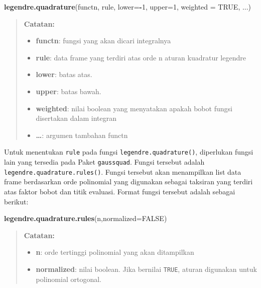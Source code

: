 \documentclass[
]{book}
\newenvironment{Shaded}{\begin{snugshade}}{\end{snugshade}}
\newcommand{\AttributeTok}[1]{\textcolor[rgb]{0.13,0.29,0.53}{#1}}
\newcommand{\ConstantTok}[1]{\textcolor[rgb]{0.56,0.35,0.01}{#1}}
\newcommand{\DecValTok}[1]{\textcolor[rgb]{0.00,0.00,0.81}{#1}}
\newcommand{\FunctionTok}[1]{\textcolor[rgb]{0.13,0.29,0.53}{\textbf{#1}}}
\newcommand{\NormalTok}[1]{#1}
\newcommand{\SpecialCharTok}[1]{\textcolor[rgb]{0.81,0.36,0.00}{\textbf{#1}}}
\providecommand{\tightlist}{%
  \setlength{\itemsep}{0pt}\setlength{\parskip}{0pt}}
\theoremstyle{definition}
\theoremstyle{definition}
\theoremstyle{definition}
\theoremstyle{definition}
\theoremstyle{remark}
\begin{document}
\begin{Shaded}
\begin{Highlighting}[]
\FunctionTok{legendre.quadrature}\NormalTok{(functn, rule, }\AttributeTok{lower=}\SpecialCharTok{{-}}\DecValTok{1}\NormalTok{, }\AttributeTok{upper=}\DecValTok{1}\NormalTok{, }
  \AttributeTok{weighted =} \ConstantTok{TRUE}\NormalTok{, ...)}
\end{Highlighting}
\end{Shaded}

\begin{quote}
\textbf{Catatan:}

\begin{itemize}
\tightlist
\item
  \textbf{functn}: fungsi yang akan dicari integralnya
\item
  \textbf{rule}: data frame yang terdiri atas orde n aturan kuadratur legendre
\item
  \textbf{lower}: batas atas.
\item
  \textbf{upper}: batas bawah.
\item
  \textbf{weighted}: nilai boolean yang menyatakan apakah bobot fungsi disertakan dalam integran
\item
  \textbf{\ldots{}}: argumen tambahan functn
\end{itemize}
\end{quote}

Untuk menentukan \texttt{rule} pada fungsi \texttt{legendre.quadrature()}, diperlukan fungsi lain yang tersedia pada Paket \texttt{gaussquad}. Fungsi tersebut adalah \texttt{legendre.quadrature.rules()}. Fungsi tersebut akan menampilkan list data frame berdasarkan orde polinomial yang digunakan sebagai taksiran yang terdiri atas faktor bobot dan titik evaluasi. Format fungsi tersebut adalah sebagai berikut:

\begin{Shaded}
\begin{Highlighting}[]
\FunctionTok{legendre.quadrature.rules}\NormalTok{(n,}\AttributeTok{normalized=}\ConstantTok{FALSE}\NormalTok{)}
\end{Highlighting}
\end{Shaded}

\begin{quote}
\textbf{Catatan:}

\begin{itemize}
\tightlist
\item
  \textbf{n}: orde tertinggi polinomial yang akan ditampilkan
\item
  \textbf{normalized}: nilai boolean. Jika bernilai \texttt{TRUE}, aturan digunakan untuk polinomial ortogonal.
\end{itemize}
\end{quote}
\end{document}
